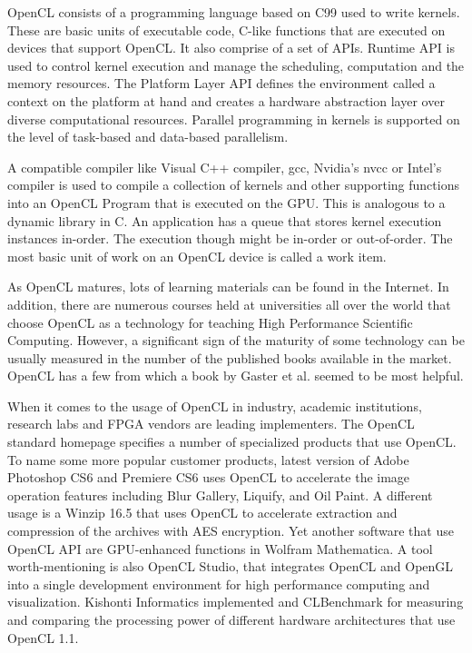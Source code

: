 OpenCL consists of a programming language based on C99 used to write kernels. These are basic units of executable code, C-like functions that are executed on devices that support OpenCL. It also comprise of a set of APIs. Runtime API is used to control kernel execution and manage the scheduling, computation and the memory resources. The Platform Layer API defines the environment called a context on the platform at hand and creates a hardware abstraction layer over diverse computational resources. Parallel programming in kernels is supported on the level of task-based and data-based parallelism.\cite{khronos2012cloverview}

A compatible compiler like Visual C++ compiler, gcc, Nvidia's nvcc or Intel's compiler is used to compile a collection of kernels and other supporting functions into an OpenCL Program that is executed on the GPU. This is analogous to a dynamic library in C. An application has a queue that stores kernel execution instances in-order. The execution though might be in-order or out-of-order. The most basic unit of work on an OpenCL device is called a work item.

As OpenCL matures, lots of learning materials can be found in the Internet. In addition, there are numerous courses held at universities all over the world that choose OpenCL as a technology for teaching High Performance Scientific Computing. However, a significant sign of the maturity of some technology can be usually measured in the number of the published books available in the market. OpenCL has a few from which a book by Gaster et al. \cite{gaster2011heterogeneous} seemed to be most helpful.

When it comes to the usage of OpenCL in industry, academic institutions, research labs and FPGA vendors are leading implementers. The OpenCL standard homepage\cite{khronos2012opencl} specifies a number of specialized products that use OpenCL. To name some more popular customer products, latest version of Adobe Photoshop CS6 and Premiere CS6\cite{adobe2012} uses OpenCL to accelerate the image operation features including Blur Gallery, Liquify, and Oil Paint. A different usage is a Winzip 16.5 that uses OpenCL to accelerate extraction and compression of the archives with AES encryption. Yet another software that use OpenCL API are GPU-enhanced functions in Wolfram Mathematica.\cite{amd2012apps, amd2012apps2} A tool worth-mentioning is also OpenCL Studio\cite{openclstudio2012}, that integrates OpenCL and OpenGL into a single development environment for high performance computing and visualization. Kishonti Informatics implemented and CLBenchmark\cite{clbenchmark2012} for measuring and comparing the processing power of different hardware architectures that use OpenCL 1.1.

